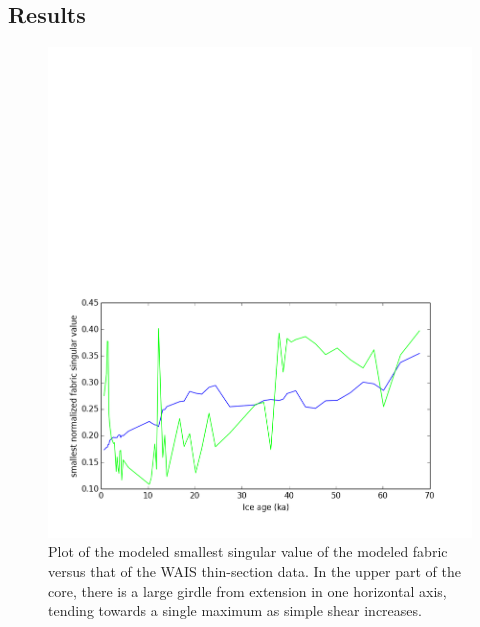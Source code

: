 \documentclass{igs}
\begin{document}
\subsection{Results}

\begin{figure}
   \caption{Plot of the modeled smallest singular value of the modeled fabric versus that of the WAIS thin-section data. In the upper part of the core, there is a large girdle from extension in one horizontal axis, tending towards a single maximum as simple shear increases.} 
\includegraphics[width=12cm]{waisfit}
\end{figure}
\end{document}
